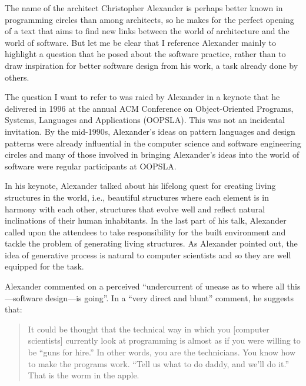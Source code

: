 
The name of the architect Christopher Alexander is perhaps better known in programming
circles than among architects, so he makes for the perfect opening of a text that aims
to find new links between the world of architecture and the world of software. But let
me be clear that I reference Alexander mainly to highlight a question that he posed about
the software practice, rather than to draw inspiration for better software design from his
work, a task already done by others.

The question I want to refer to was raied by Alexander in a keynote that he delivered in
1996 at the annual ACM Conference on Object-Oriented Programs, Systems, Languages and
Applications (OOPSLA). This was not an incidental invitation. By the mid-1990s, Alexander's ideas
on pattern languages and design patterns were already influential in the computer science and
software engineering circles and many of those involved in bringing Alexander's ideas into the
world of software were regular participants at OOPSLA.

In his keynote, Alexander talked about his lifelong quest for creating living structures
in the world, i.e., beautiful structures where each element is in harmony with each other,
structures that evolve well and reflect natural inclinations of their human inhabitants.
In the last part of his talk, Alexander called upon the attendees to take responsibility
for the built environment and tackle the problem of generating living structures.
As Alexander pointed out, the idea of generative process is natural to computer scientists
and so they are well equipped for the task.

Alexander commented on a perceived ``undercurrent of unease as to where all
this---software design---is going''. In a ``very direct and blunt'' comment, he suggests that:

\begin{quote}
It could be thought that the technical way in which you [computer scientists] currently look at
programming is almost as if you were willing to be ``guns for hire.'' In other words, you are the
technicians. You know how to make the programs work. ``Tell us what to do daddy, and we'll do it.''
That is the worm in the apple.
\end{quote}

